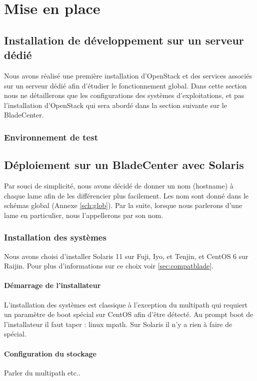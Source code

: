 \documentclass[a4paper,oneside]{report}
\begin{document}
\chapter{Mise en place}
\section{Installation de développement sur un serveur dédié}
Nous avons réalisé une première installation d'OpenStack et des services associés sur un serveur dédié afin d'étudier le fonctionnement global.
Dans cette section nous ne détaillerons que les configurations des systèmes d'exploitations, et pas l'installation d'OpenStack qui sera abordé dans la section suivante sur le BladeCenter.

\subsection{Environnement de test}

\section{Déploiement sur un BladeCenter avec Solaris}

Par souci de simplicité, nous avons décidé de donner un nom (hostname) à chaque lame afin de les différencier plus facilement.
Les nom sont donné dans le schémas global (Annexe \ref{sch:glob}).
Par la suite, lorsque nous parlerons d'une lame en particulier, nous l'appellerons par son nom.

\subsection{Installation des systèmes}
Nous avons choisi d'installer Solaris 11 sur Fuji, Iyo, et Tenjin, et CentOS 6 sur Raijin.
Pour plus d'informations sur ce choix voir \ref{sec:compatblade}.

\subsubsection{Démarrage de l'installateur}
L'installation des systèmes est classique à l'exception du multipath qui requiert un paramètre de boot spécial sur CentOS afin d'être détecté.
Au prompt boot de l'installateur il faut taper : linux mpath.\newline
Sur Solaris il n'y a rien à faire de spécial.

\subsubsection{Configuration du stockage}
Parler du multipath etc..
\end{document}
